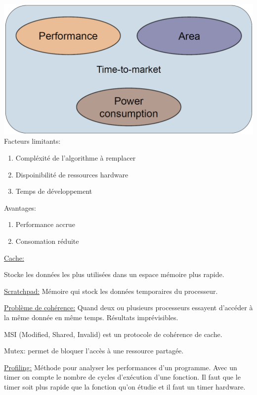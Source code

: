 \includegraphics[width=\columnwidth]{images/trade_off_power_area_perf.png}
Facteurs limitants:
\begin{enumerate}[topsep=0pt, partopsep=0pt, itemsep=0pt, parsep=0pt]
    \item Compléxité de l'algorithme à remplacer
    \item Dispoinibilité de ressources hardware
    \item Temps de développement
\end{enumerate}
Avantages:
\begin{enumerate}[topsep=0pt, partopsep=0pt, itemsep=0pt, parsep=0pt]
    \item Performance accrue
    \item Consomation réduite
\end{enumerate}

\underline{Cache:}

Stocke les données les plus utilisées dans un espace mémoire plus rapide.

\underline{Scratchpad:}
Mémoire qui stock les données temporaires du processeur.

\underline{Problème de cohérence:}
Quand deux ou plusieurs processeurs essayent d'accéder à la même donnée en même temps.
Résultats imprévisibles.

MSI (Modified, Shared, Invalid) est un protocole de cohérence de cache.

Mutex: permet de bloquer l'accès à une ressource partagée.

\underline{Profiling:}
Méthode pour analyser les performances d'un programme. Avec un timer on compte le nombre
de cycles d'exécution d'une fonction. Il faut que le timer soit plus rapide que la fonction
qu'on étudie et il faut un timer hardware.


